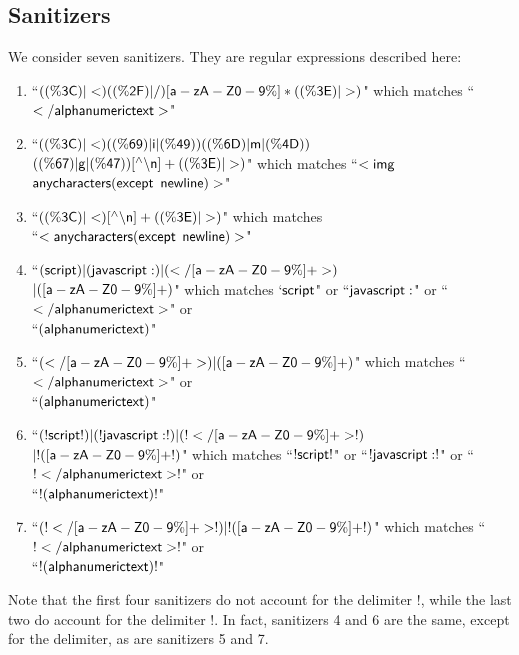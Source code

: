 \subsection{Sanitizers} \label{ss:sanitizers}
We consider seven sanitizers. They are regular expressions described here:
\begin{enumerate}
	\item ``$\sf{((\%3C)|<)((\%2F)|/)[a-zA-Z0-9\%]*((\%3E)|>)}$" which matches ``$\sf{</alphanumerictext>}$"
	\item ``$\sf{((\%3C)|<)((\%69)|i|(\%49))((\%6D)|m|(\%4D))}$\\$\sf{((\%67)|g|(\%47))[^\wedge\backslash n]+((\%3E)|>)}$" which matches ``$\sf{<img}$ $\sf{anycharacters(except}$ $\sf{newline)>}$"
	\item ``$\sf{((\%3C)|<)[^\wedge\backslash n]+((\%3E)|>)}$" which matches \\``$\sf{<anycharacters(except}$ $\sf{newline)>}$"
	\item ``$\sf{(script)|(javascript:)|(</[a-zA-Z0-9\%]+>)}$\\$\sf{|([a-zA-Z0-9\%]+)}$" which matches `$\sf{script}$" or ``$\sf{javascript:}$" or ``$\sf{</alphanumerictext>}$" or \\``$\sf{(alphanumerictext)}$"
	\item ``$\sf{(</[a-zA-Z0-9\%]+>)|([a-zA-Z0-9\%]+)}$" which matches ``$\sf{</alphanumerictext>}$" or\\ ``$\sf{(alphanumerictext)}$"
	\item ``$\sf{(!script!)|(!javascript:!)|(!</[a-zA-Z0-9\%]+>!)}$\\$\sf{|!([a-zA-Z0-9\%]+!)}$" which matches ``$\sf{!script!}$" or ``$\sf{!javascript:!}$" or ``$\sf{!</alphanumerictext>!}$" or \\ ``$\sf{!(alphanumerictext)!}$"
	\item ``$\sf{(!</[a-zA-Z0-9\%]+>!)|!([a-zA-Z0-9\%]+!)}$" which matches ``$\sf{!</alphanumerictext>!}$" or\\ ``$\sf{!(alphanumerictext)!}$"
\end{enumerate}
Note that the first four sanitizers do not account for the delimiter $!$, while the last two do account for the delimiter $!$. In fact, sanitizers 4 and 6 are the same, except for the delimiter, as are sanitizers 5 and 7. 

